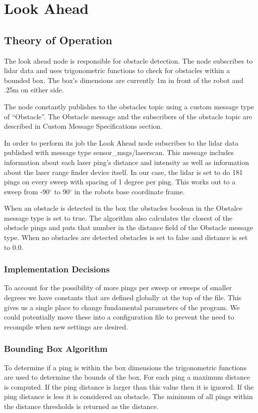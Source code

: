 \section{Look Ahead}
\subsection{Theory of Operation}

The look ahead node is responsible for obstacle detection. The node
subscribes to lidar data and uses trigonometric functions to check for
obstacles within a bounded box.  The box's dimensions are currently 1m
in front of the robot and .25m on either side. 

The node constantly publishes to the obstacles topic using a custom
message type of ``Obstacle''.  The Obstacle message and the
subscribers of the obstacle topic are described in Custom Message
Specifications section.

In order to perform its job the Look Ahead node subscribes to the
lidar data published with message type sensor\_msgs/laserscan. This message
includes information about each laser ping's distance and intensity as
well as information about the laser range finder device itself.  In
our case, the lidar is set to do 181 pings on every sweep with spacing
of 1 degree per ping.  This works out to a sweep from -90$^\circ$ to
90$^\circ$ in the robots base coordinate frame.

When an obstacle is detected in the box the obstacles boolean in the
Obstalce message type is set to true. The algorithm also calculates
the closest of the obstacle pings and puts that number in the distance field
of the Obstacle message type. When no obstacles are detected obstacles
is set to false and distance is set to 0.0.

\subsubsection{Implementation Decisions}

To account for the possibility of more pings per sweep or sweeps of
smaller degrees we have constants that are defined globally at the top
of the file.  This gives us a single place to change fundamental
parameters of the program.  We could potentially move these into a
configuration file to prevent the need to recompile when new settings
are desired.

\subsubsection{Bounding Box Algorithm}
To determine if a ping is within the box dimensions the trigonometric
functions are used to determine the bounds of the box.  For each ping
a maximum distance is computed.  If the ping distance is larger than this
value then it is ignored. If the ping distance is less it is
considered an obstacle.  The minimum of all pings within the distance
thresholds is returned as the distance.

